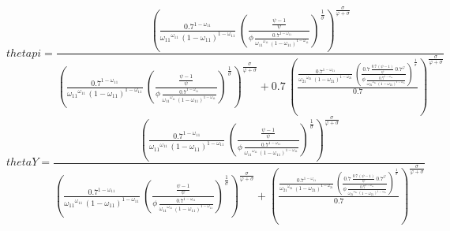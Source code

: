 \begin{dmath*}
thetapi = \frac{\left(\frac{0.7^{1-{{\omega_{11}}}}}{{{\omega_{11}}}^{{{\omega_{11}}}}\, \left(1-{{\omega_{11}}}\right)^{1-{{\omega_{11}}}}}\, \left(\frac{\frac{{{\psi}}-1}{{{\psi}}}}{{{\phi}}\, \frac{0.7^{1-{{\omega_{11}}}}}{{{\omega_{11}}}^{{{\omega_{11}}}}\, \left(1-{{\omega_{11}}}\right)^{1-{{\omega_{11}}}}}}\right)^{\frac{1}{{{\sigma}}}}\right)^{\frac{{{\sigma}}}{{{\varphi}}+{{\sigma}}}}}{\left(\frac{0.7^{1-{{\omega_{11}}}}}{{{\omega_{11}}}^{{{\omega_{11}}}}\, \left(1-{{\omega_{11}}}\right)^{1-{{\omega_{11}}}}}\, \left(\frac{\frac{{{\psi}}-1}{{{\psi}}}}{{{\phi}}\, \frac{0.7^{1-{{\omega_{11}}}}}{{{\omega_{11}}}^{{{\omega_{11}}}}\, \left(1-{{\omega_{11}}}\right)^{1-{{\omega_{11}}}}}}\right)^{\frac{1}{{{\sigma}}}}\right)^{\frac{{{\sigma}}}{{{\varphi}}+{{\sigma}}}}+0.7\, \left(\frac{\frac{0.7^{1-{{\omega_{11}}}}}{{{\omega_{21}}}^{{{\omega_{21}}}}\, \left(1-{{\omega_{21}}}\right)^{1-{{\omega_{21}}}}}\, \left(\frac{0.7\, \frac{0.7\, \left({{\psi}}-1\right)}{{{\psi}}}\, 0.7^{{{\varphi}}}}{{{\phi}}\, \frac{0.7^{1-{{\omega_{11}}}}}{{{\omega_{21}}}^{{{\omega_{21}}}}\, \left(1-{{\omega_{21}}}\right)^{1-{{\omega_{21}}}}}}\right)^{\frac{1}{{{\sigma}}}}}{0.7}\right)^{\frac{{{\sigma}}}{{{\varphi}}+{{\sigma}}}}}
\end{dmath*}
\begin{dmath*}
thetaY = \frac{\left(\frac{0.7^{1-{{\omega_{11}}}}}{{{\omega_{11}}}^{{{\omega_{11}}}}\, \left(1-{{\omega_{11}}}\right)^{1-{{\omega_{11}}}}}\, \left(\frac{\frac{{{\psi}}-1}{{{\psi}}}}{{{\phi}}\, \frac{0.7^{1-{{\omega_{11}}}}}{{{\omega_{11}}}^{{{\omega_{11}}}}\, \left(1-{{\omega_{11}}}\right)^{1-{{\omega_{11}}}}}}\right)^{\frac{1}{{{\sigma}}}}\right)^{\frac{{{\sigma}}}{{{\varphi}}+{{\sigma}}}}}{\left(\frac{0.7^{1-{{\omega_{11}}}}}{{{\omega_{11}}}^{{{\omega_{11}}}}\, \left(1-{{\omega_{11}}}\right)^{1-{{\omega_{11}}}}}\, \left(\frac{\frac{{{\psi}}-1}{{{\psi}}}}{{{\phi}}\, \frac{0.7^{1-{{\omega_{11}}}}}{{{\omega_{11}}}^{{{\omega_{11}}}}\, \left(1-{{\omega_{11}}}\right)^{1-{{\omega_{11}}}}}}\right)^{\frac{1}{{{\sigma}}}}\right)^{\frac{{{\sigma}}}{{{\varphi}}+{{\sigma}}}}+\left(\frac{\frac{0.7^{1-{{\omega_{11}}}}}{{{\omega_{21}}}^{{{\omega_{21}}}}\, \left(1-{{\omega_{21}}}\right)^{1-{{\omega_{21}}}}}\, \left(\frac{0.7\, \frac{0.7\, \left({{\psi}}-1\right)}{{{\psi}}}\, 0.7^{{{\varphi}}}}{{{\phi}}\, \frac{0.7^{1-{{\omega_{11}}}}}{{{\omega_{21}}}^{{{\omega_{21}}}}\, \left(1-{{\omega_{21}}}\right)^{1-{{\omega_{21}}}}}}\right)^{\frac{1}{{{\sigma}}}}}{0.7}\right)^{\frac{{{\sigma}}}{{{\varphi}}+{{\sigma}}}}}
\end{dmath*}
